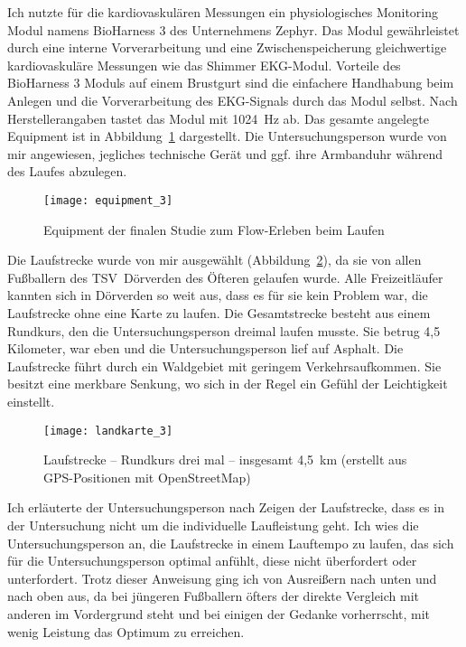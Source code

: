 Ich nutzte für die kardiovaskulären Messungen ein physiologisches Monitoring Modul namens BioHarness 3 des Unternehmens Zephyr. Das Modul gewährleistet durch eine interne Vorverarbeitung und eine Zwischenspeicherung gleichwertige kardiovaskuläre Messungen wie das Shimmer \ac{EKG}-Modul. Vorteile des BioHarness 3 Moduls auf einem Brustgurt sind die einfachere Handhabung beim Anlegen und die Vorverarbeitung des \ac{EKG}-Signals durch das Modul selbst. Nach Herstellerangaben tastet das Modul mit 1024~Hz ab. Das gesamte angelegte Equipment ist in Abbildung~\ref{fig:equipment_3} dargestellt. Die Untersuchungsperson wurde von mir angewiesen, jegliches technische Gerät und ggf. ihre Armbanduhr während des Laufes abzulegen. 
\begin{figure}
	[!htb] \centering 
	\texttt{[image: equipment\_3]} \caption[Equipment (Finale Studie: Laufen)]{Equipment der finalen Studie zum Flow-Erleben beim Laufen} \label{fig:equipment_3} 
\end{figure}

Die Laufstrecke wurde von mir ausgewählt (Abbildung~\ref{fig:landkarte_3}), da sie von allen Fußballern des TSV~Dörverden des Öfteren gelaufen wurde. Alle Freizeitläufer kannten sich in Dörverden so weit aus, dass es für sie kein Problem war, die Laufstrecke ohne eine Karte zu laufen. Die Gesamtstrecke besteht aus einem Rundkurs, den die Untersuchungsperson dreimal laufen musste. Sie betrug 4,5 Kilometer, war eben und die Untersuchungsperson lief auf Asphalt. Die Laufstrecke führt durch ein Waldgebiet mit geringem Verkehrsaufkommen. Sie besitzt eine merkbare Senkung, wo sich in der Regel ein Gefühl der Leichtigkeit einstellt. 
\begin{figure}
	[!htb] \centering 
	\texttt{[image: landkarte\_3]} \caption[Laufstrecke -- Rundkurs]{Laufstrecke -- Rundkurs drei mal -- insgesamt 4,5~km (erstellt aus \acs{GPS}-Positionen mit OpenStreetMap)} \label{fig:landkarte_3} 
\end{figure}

Ich erläuterte der Untersuchungsperson nach Zeigen der Laufstrecke, dass es in der Untersuchung nicht um die individuelle Laufleistung geht. Ich wies die Untersuchungsperson an, die Laufstrecke in einem Lauftempo zu laufen, das sich für die Untersuchungsperson optimal anfühlt, diese nicht überfordert oder unterfordert. Trotz dieser Anweisung ging ich von Ausreißern nach unten und nach oben aus, da bei jüngeren Fußballern öfters der direkte Vergleich mit anderen im Vordergrund steht und bei einigen der Gedanke vorherrscht, mit wenig Leistung das Optimum zu erreichen. 

